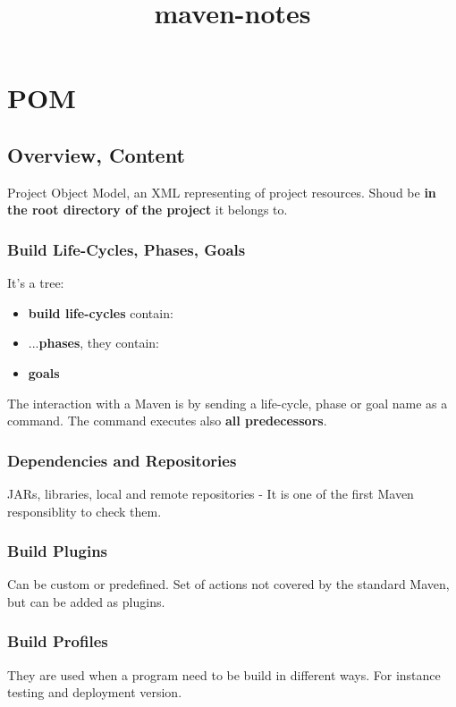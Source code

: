 \documentclass{report}
\title{maven-notes}
\begin{document}
\maketitle
{}
\tableofcontents



\part{POM}


\chapter{Overview, Content}
Project Object Model, an XML representing of project resources. Shoud be \textbf{in the root directory of the project }it belongs to.


\section{Build Life-Cycles, Phases, Goals}
It's a tree:
\begin{itemize}
	\item \textbf{build life-cycles} contain:
	\item ...\textbf{phases}, they contain:
	\item \textbf{goals}
\end{itemize}

The interaction with a Maven is by sending a life-cycle, phase or goal name as a command. The command executes also \textbf{all predecessors}.


\section{Dependencies and Repositories}
JARs, libraries, local and remote repositories - It is one of the first Maven responsiblity to check them.


\section{Build Plugins}
Can be custom or predefined. Set of actions not covered by the standard Maven, but can be added  as plugins.


\section{Build Profiles}
They are used when a program need to be build in different ways. For instance testing and deployment version.
\end{document}

